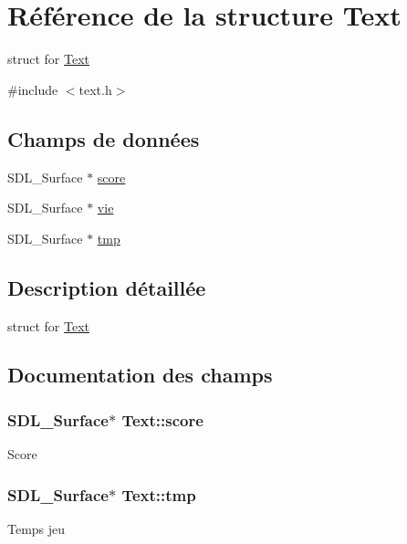 \hypertarget{structText}{}\section{Référence de la structure Text}
\label{structText}


struct for \hyperlink{structText}{Text}  




{\ttfamily \#include $<$text.\+h$>$}

\subsection*{Champs de données}
\begin{DoxyCompactItemize}
\item 
S\+D\+L\+\_\+\+Surface $\ast$ \hyperlink{structText_aff6d6c980d60246e053f3073f52b6176}{score}
\item 
S\+D\+L\+\_\+\+Surface $\ast$ \hyperlink{structText_a0fcc09b9e71277a628a94d5cc1009e82}{vie}
\item 
S\+D\+L\+\_\+\+Surface $\ast$ \hyperlink{structText_acb7a71b616bd8ff9c3bf1ed75b7075aa}{tmp}
\end{DoxyCompactItemize}


\subsection{Description détaillée}
struct for \hyperlink{structText}{Text} 

\subsection{Documentation des champs}
\subsubsection[{\texorpdfstring{score}{score}}]{\setlength{\rightskip}{0pt plus 5cm}S\+D\+L\+\_\+\+Surface$\ast$ Text\+::score}\hypertarget{structText_aff6d6c980d60246e053f3073f52b6176}{}\label{structText_aff6d6c980d60246e053f3073f52b6176}
Score 
\subsubsection[{\texorpdfstring{tmp}{tmp}}]{\setlength{\rightskip}{0pt plus 5cm}S\+D\+L\+\_\+\+Surface$\ast$ Text\+::tmp}\hypertarget{structText_acb7a71b616bd8ff9c3bf1ed75b7075aa}{}\label{structText_acb7a71b616bd8ff9c3bf1ed75b7075aa}
Temps jeu 
